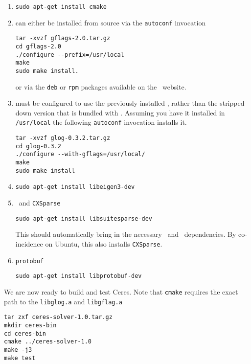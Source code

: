 \begin{enumerate}
\item{\cmake}
\begin{verbatim}
sudo apt-get install cmake
\end{verbatim}

\item{\gflags} can either be installed from source via the \texttt{autoconf} invocation
\begin{verbatim}
tar -xvzf gflags-2.0.tar.gz
cd gflags-2.0
./configure --prefix=/usr/local
make
sudo make install.
\end{verbatim}
or via the \texttt{deb} or \texttt{rpm} packages available on the \gflags\ website.

\item{\glog} must be configured to use the previously installed
\gflags, rather than the stripped down version that is bundled with \glog. Assuming you have it installed in \texttt{/usr/local} the following \texttt{autoconf} invocation installs it.
\begin{verbatim}
tar -xvzf glog-0.3.2.tar.gz
cd glog-0.3.2
./configure --with-gflags=/usr/local/
make
sudo make install
\end{verbatim}

\item{\eigen}
\begin{verbatim}
sudo apt-get install libeigen3-dev
\end{verbatim}

\item{\suitesparse\ and \texttt{CXSparse}}
\begin{verbatim}
sudo apt-get install libsuitesparse-dev
\end{verbatim}
This should automatically bring in the necessary \blas\ and \lapack\ dependencies. By co-incidence on Ubuntu, this also installs \texttt{CXSparse}.

\item{\texttt{protobuf}}
\begin{verbatim}
sudo apt-get install libprotobuf-dev
\end{verbatim}
\end{enumerate}


We are now ready to build and test Ceres. Note that \texttt{cmake} requires the exact path to the \texttt{libglog.a} and \texttt{libgflag.a}

\begin{verbatim}
tar zxf ceres-solver-1.0.tar.gz
mkdir ceres-bin
cd ceres-bin
cmake ../ceres-solver-1.0
make -j3
make test
\end{verbatim}

